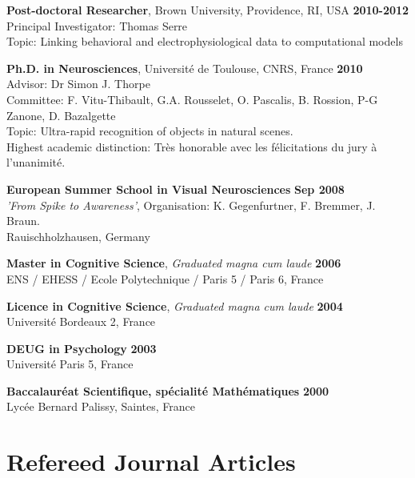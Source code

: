 \documentclass[margin,line]{resume}
\begin{document}
\begin{resume}
	\textbf{Post-doctoral Researcher}, Brown University, Providence, RI, USA \hfill \textbf{2010-2012}\\
	Principal Investigator: Thomas Serre\\
	Topic: Linking behavioral and electrophysiological data to computational models
	\vspace{-1.5mm}
	
    \textbf{Ph.D. in Neurosciences}, Université de Toulouse, CNRS, France \hfill \textbf{2010}\\
	Advisor:  Dr Simon J. Thorpe\\
	Committee: F. Vitu-Thibault, G.A. Rousselet, O. Pascalis, B. Rossion, P-G Zanone, D. Bazalgette\\
	Topic: Ultra-rapid recognition of objects in natural scenes.\\
	Highest academic distinction: Très honorable avec les félicitations du jury à l'unanimité.
	\vspace{-1.5mm}

	\textbf{European Summer School in Visual Neurosciences} \hfill \textbf{Sep 2008}\\
	\textsl{'From Spike to Awareness'}, Organisation: K. Gegenfurtner, F. Bremmer, J. Braun.\\
	Rauischholzhausen, Germany
	\vspace{-1.5mm}

	\textbf{Master in Cognitive Science}, \textsl{Graduated magna cum laude} \hfill \textbf{2006}\\
	ENS / EHESS / Ecole Polytechnique / Paris 5 / Paris 6, France
	\vspace{-1.5mm}

	\textbf{Licence in Cognitive Science}, \textsl{Graduated magna cum laude} \hfill \textbf{2004}\\
	Université Bordeaux 2, France
	\vspace{-1.5mm}
	
	\textbf{DEUG in Psychology} \hfill \textbf{2003}\\
	Université Paris 5, France
	\vspace{-1.5mm}
	
	\textbf{Baccalauréat Scientifique, spécialité Mathématiques} \hfill \textbf{2000}\\
	Lycée Bernard Palissy, Saintes, France

	\vspace{3mm}	
    \section{\mysidestyle Refereed Journal Articles}
	

\end{resume}
\end{document}
